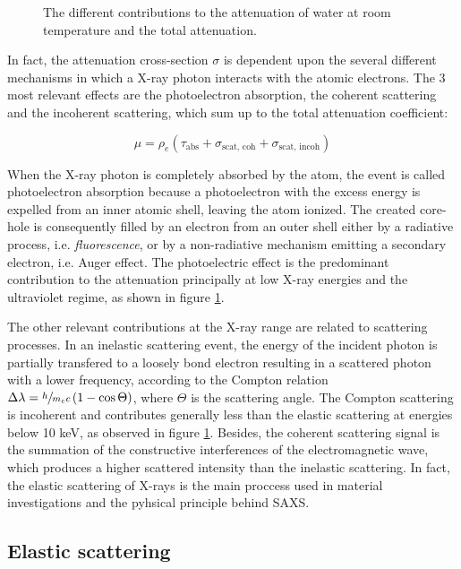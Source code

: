 \begin{figure}%
	\centering
		
		\caption{The different contributions to the attenuation of water at room temperature and the total attenuation.}
		\label{fig:AttenuationWater}
\end{figure}

In fact, the attenuation cross-section $\sigma$ is dependent upon the several different mechanisms in which a X-ray photon interacts with the atomic electrons. The 3 most relevant effects are the photoelectron absorption, the coherent scattering and the incoherent scattering, which sum up to the total attenuation coefficient:

\begin{equation}
        \mu = \rho_e (\tau_{\text{abs}}+\sigma_{\text{scat, coh}}+\sigma_{\text{scat, incoh}})
\end{equation}

When the X-ray photon is completely absorbed by the atom, the event is called photoelectron absorption because a photoelectron with the excess energy is expelled from an inner atomic shell, leaving the atom ionized. The created core-hole is consequently filled by an electron from an outer shell either by a radiative process, i.e. \emph{fluorescence}, or by a non-radiative mechanism emitting a secondary electron, i.e. Auger effect. The photoelectric effect is the predominant contribution to the attenuation principally at low X-ray energies and the ultraviolet regime, as shown in figure \ref{fig:AttenuationWater}. 

The other relevant contributions at the X-ray range are related to scattering processes. In an inelastic scattering event, the energy of the incident photon is partially transfered to a loosely bond electron resulting in a scattered photon with a lower frequency, according to the Compton relation $\Delta\lambda = \sfrac{h}{m_e c}\left( 1 - \cos{\Theta} \right) $, where $\Theta$ is the scattering angle. The Compton scattering is incoherent and contributes generally less than the elastic scattering at energies below 10 keV, as observed in figure \ref{fig:AttenuationWater}. Besides, the coherent scattering signal is the summation of the constructive interferences of the electromagnetic wave, which produces a higher scattered intensity than the inelastic scattering. In fact, the elastic scattering of X-rays is the main proccess used in material investigations and the pyhsical principle behind SAXS.

\subsection{Elastic scattering}


